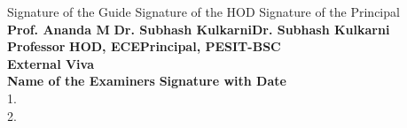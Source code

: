 \begin{spacing}{0}
\vspace{3.0cm}
\large{ Signature of the Guide} \hspace*{0.2in} \large{ Signature of the HOD} \hspace*{0.3in} \large{ Signature of the Principal}\\[0.2cm]

\textbf{Prof. Ananda M}
\hspace*{0.6in}\large{\textbf{Dr. Subhash Kulkarni}}\hspace*{0.4in}\large{\textbf{Dr. Subhash Kulkarni}}\\ [0.2cm]

\textbf{Professor}
\hspace*{1.5in}\textbf{HOD, ECE}\hspace*{1in}\textbf{Principal, PESIT-BSC} \\[1.2cm]

\Large{\textbf{External Viva }}\\[0.5cm]
\large{\hspace*{0.3in}\textbf{Name of the Examiners}} \hspace*{2in} \large{\textbf{Signature with Date}}\\[1cm]
1. \\[1.2cm]
2. \\

\end{spacing}